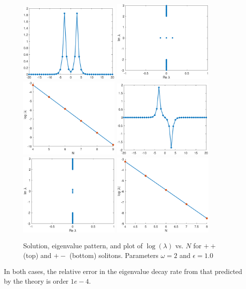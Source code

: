 \documentclass[12pt]{article}
\begin{document}
\begin{figure}[H]
\centering
\includegraphics[width=5cm]{dnlsPP.eps}
\includegraphics[width=5cm]{dnlsPPeig.eps}
\includegraphics[width=5cm]{dnlsPPdecay.eps}
\includegraphics[width=5cm]{dnlsPM.eps}
\includegraphics[width=5cm]{dnlsPMeig.eps}
\includegraphics[width=5cm]{dnlsPMdecay.eps}
\label{fig:eigendecay1}
\caption{Solution, eigenvalue pattern, and plot of $\log(\lambda)$ vs. $N$ for $++$ (top) and $+-$ (bottom) solitons. Parameters $\omega = 2$ and $\epsilon = 1.0$}
\end{figure}
In both cases, the relative error in the eigenvalue decay rate from that predicted by the theory is order $1e-4$.
\end{document}
